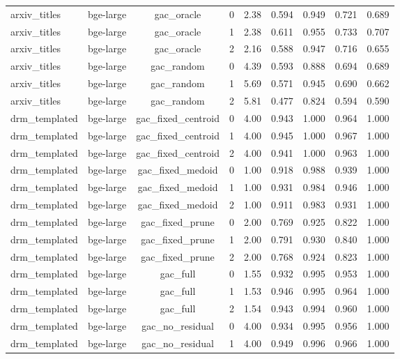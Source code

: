 \begin{longtable}{lcccccccc}
arxiv\_titles & bge-large & gac\_oracle & 0 & 2.38 & 0.594 & 0.949 & 0.721 & 0.689 \\
arxiv\_titles & bge-large & gac\_oracle & 1 & 2.38 & 0.611 & 0.955 & 0.733 & 0.707 \\
arxiv\_titles & bge-large & gac\_oracle & 2 & 2.16 & 0.588 & 0.947 & 0.716 & 0.655 \\
arxiv\_titles & bge-large & gac\_random & 0 & 4.39 & 0.593 & 0.888 & 0.694 & 0.689 \\
arxiv\_titles & bge-large & gac\_random & 1 & 5.69 & 0.571 & 0.945 & 0.690 & 0.662 \\
arxiv\_titles & bge-large & gac\_random & 2 & 5.81 & 0.477 & 0.824 & 0.594 & 0.590 \\
drm\_templated & bge-large & gac\_fixed\_centroid & 0 & 4.00 & 0.943 & 1.000 & 0.964 & 1.000 \\
drm\_templated & bge-large & gac\_fixed\_centroid & 1 & 4.00 & 0.945 & 1.000 & 0.967 & 1.000 \\
drm\_templated & bge-large & gac\_fixed\_centroid & 2 & 4.00 & 0.941 & 1.000 & 0.963 & 1.000 \\
drm\_templated & bge-large & gac\_fixed\_medoid & 0 & 1.00 & 0.918 & 0.988 & 0.939 & 1.000 \\
drm\_templated & bge-large & gac\_fixed\_medoid & 1 & 1.00 & 0.931 & 0.984 & 0.946 & 1.000 \\
drm\_templated & bge-large & gac\_fixed\_medoid & 2 & 1.00 & 0.911 & 0.983 & 0.931 & 1.000 \\
drm\_templated & bge-large & gac\_fixed\_prune & 0 & 2.00 & 0.769 & 0.925 & 0.822 & 1.000 \\
drm\_templated & bge-large & gac\_fixed\_prune & 1 & 2.00 & 0.791 & 0.930 & 0.840 & 1.000 \\
drm\_templated & bge-large & gac\_fixed\_prune & 2 & 2.00 & 0.768 & 0.924 & 0.823 & 1.000 \\
drm\_templated & bge-large & gac\_full & 0 & 1.55 & 0.932 & 0.995 & 0.953 & 1.000 \\
drm\_templated & bge-large & gac\_full & 1 & 1.53 & 0.946 & 0.995 & 0.964 & 1.000 \\
drm\_templated & bge-large & gac\_full & 2 & 1.54 & 0.943 & 0.994 & 0.960 & 1.000 \\
drm\_templated & bge-large & gac\_no\_residual & 0 & 4.00 & 0.934 & 0.995 & 0.956 & 1.000 \\
drm\_templated & bge-large & gac\_no\_residual & 1 & 4.00 & 0.949 & 0.996 & 0.966 & 1.000 \\

\end{longtable}
